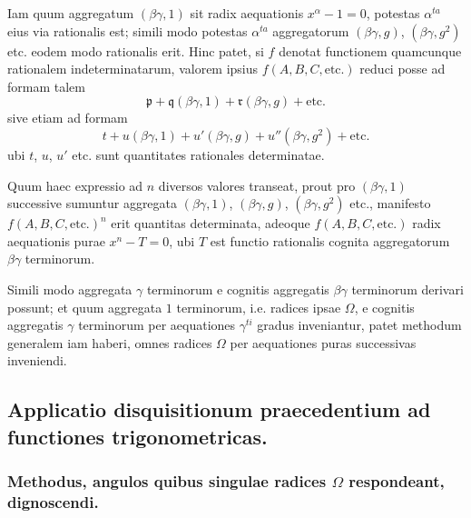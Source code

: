 \documentclass[12pt,a4paper]{article}
\theoremstyle{plain}
\theoremstyle{definition}
\theoremstyle{remark}
\begin{document}
Iam quum aggregatum $(\beta\gamma, 1)$ sit radix aequationis
$x^{\alpha} - 1 = 0$, potestas $\alpha^{ta}$ eius via rationalis est;
simili modo potestas $\alpha^{ta}$ aggregatorum $(\beta\gamma, g)$,
$(\beta\gamma, g^2)$ etc. eodem modo rationalis erit. Hinc patet, si
$f$ denotat functionem quamcunque rationalem indeterminatarum, valorem
ipsius $f(A, B, C, \text{etc.})$ reduci posse ad formam talem
\[
\mathfrak{p} + \mathfrak{q}(\beta\gamma, 1) + \mathfrak{r}(\beta\gamma, g) + \text{etc.}
\]
sive etiam ad formam
\[
t + u(\beta\gamma, 1) + u'(\beta\gamma, g) + u''(\beta\gamma, g^2) + \text{etc.}
\]
ubi $t$, $u$, $u'$ etc. sunt quantitates rationales determinatae.

Quum haec expressio ad $n$ diversos valores transeat, prout pro
$(\beta\gamma, 1)$ successive sumuntur aggregata
$(\beta\gamma, 1)$, $(\beta\gamma, g)$, $(\beta\gamma, g^2)$ etc.,
manifesto $f(A, B, C, \text{etc.})^n$ erit quantitas determinata, adeoque
$f(A, B, C, \text{etc.})$ radix aequationis purae $x^n - T = 0$, ubi $T$
est functio rationalis cognita aggregatorum $\beta\gamma$ terminorum.

Simili modo aggregata $\gamma$ terminorum e cognitis aggregatis
$\beta\gamma$ terminorum derivari possunt; et quum aggregata $1$ terminorum,
i.e. radices ipsae $\Omega$, e cognitis aggregatis $\gamma$ terminorum per
aequationes $\gamma^{ti}$ gradus inveniantur, patet methodum generalem iam
haberi, omnes radices $\Omega$ per aequationes puras successivas inveniendi.


\subsection*{Applicatio disquisitionum praecedentium ad functiones trigonometricas.}

\subsubsection*{Methodus, angulos quibus singulae radices $\Omega$ respondeant, dignoscendi.}
\end{document}
